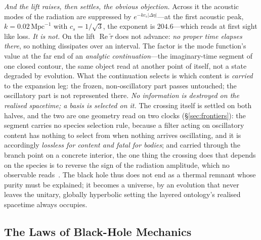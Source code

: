 \documentclass[11pt,a4paper]{article}
\theoremstyle{plain}
\theoremstyle{definition}
\theoremstyle{remark}
\begin{document}
\emph{And the lift raises, then settles, the obvious objection.} Across it the acoustic modes of the radiation are suppressed by $e^{-kc_s\lvert\Delta\eta\rvert}$---at the first
acoustic peak, $k=0.02\,\mathrm{Mpc}^{-1}$ with $c_s=1/\sqrt3$, the exponent is $204.6$---which reads at first sight like loss. \emph{It is not.} On the lift $\operatorname{Re}\tilde\tau$ does not advance: \emph{no proper time elapses there}, so nothing dissipates over an interval. The factor is the mode function's value at the far end of an \emph{analytic continuation}---the imaginary-time segment of one closed contour, the same object read at another point of itself, not a state degraded by evolution. What the continuation selects is which content is \emph{carried} to the expansion leg: the frozen, non-oscillatory part passes untouched; the oscillatory part is not represented there. \emph{No information is destroyed on the realised spacetime; a basis is selected on it.} The crossing itself is settled on both halves, and the two are one geometry read on two clocks (\S\ref{sec:frontiers}): the segment carries no species selection rule, because a filter acting on oscillatory content has nothing to select from when nothing arrives oscillating, and it is accordingly \emph{lossless for content and fatal for bodies}; and carried through the branch point on a concrete interior, the one thing the crossing does that depends on the species is to reverse the sign of the radiation amplitude, which no observable reads~\cite{JanzenCosmogenesis}. The black hole thus does not end as a thermal remnant whose purity must be explained; it becomes a universe, by an evolution that never leaves the unitary, globally hyperbolic setting the layered ontology's realised spacetime always occupies.

\subsection{The Laws of Black-Hole Mechanics}\label{sec:CR-mechanics}
\end{document}

